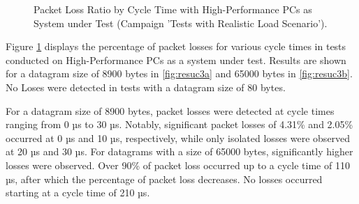 \begin{figure}[h!]
  \centering
  \caption{Packet Loss Ratio by Cycle Time with High-Performance PCs as System under Test (Campaign 'Tests with Realistic Load Scenario').}
  \label{fig:resuc3}
\end{figure}

Figure \ref{fig:resuc3} displays the percentage of packet losses for various cycle times in tests conducted on High-Performance PCs as a system under test. Results are shown for a datagram size of 8900 bytes in \ref{fig:resuc3a} and 65000 bytes in \ref{fig:resuc3b}. No Loses were detected in tests with a datagram size of 80 bytes.

For a datagram size of 8900 bytes, packet losses were detected at cycle times ranging from 0 µs to 30 µs. Notably, significant packet losses of 4.31\% and 2.05\% occurred at 0 µs and 10 µs, respectively, while only isolated losses were observed at 20 µs and 30 µs. For datagrams with a size of 65000 bytes, significantly higher losses were observed. Over 90\% of packet loss occurred up to a cycle time of 110 µs, after which the percentage of packet loss decreases. No losses occurred starting at a cycle time of 210 µs.

